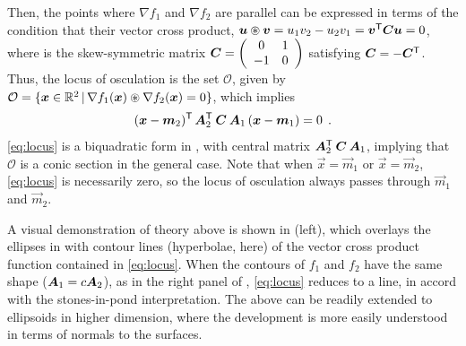 Then, the points where $\nabla f_1$ and $\nabla f_2$ are parallel can be expressed in terms of the
condition that their vector cross product, 
$\bm{u} \circledast \bm{v} = u_1 v_2 - u_2 v_1 = \bm{v}^\mathsf{T} \bm{C} \bm{u} = 0$, where  is the skew-symmetric matrix 
$ \bm{C} = \left(
\begin{array}{cc}
 0 & 1 \\ -1 & 0
\end{array}
\right)
$ satisfying $\bm{C} = -\bm{C}^\mathsf{T}$.
Thus, the locus of osculation is the set $\mathcal{O}$, given by $\mathcal{O}  = \{\bm{x} \in \mathbb{R}^{2} \, | \, \nabla f_1(\bm{x}) \circledast \nabla f_2(\bm{x}) = 0 \}$,
which implies
\begin{equation}
(\bm{x}-\bm{m}_2)^\mathsf{T} \, \bm{A}_2 ^\mathsf{T} \: \bm{C} \: \bm{A}_1 \, (\bm{x}-\bm{m}_1) = 0  \:\: .  \label{eq:locus}   
\end{equation}
\eqref{eq:locus} is a biquadratic form in , with central matrix $\bm{A}_2 ^\mathsf{T} \: \bm{C} \: \bm{A}_1$,
implying that $\mathcal{O}$ is a conic section in the general case. Note that when $\vec{x}=\vec{m}_1$ or $\vec{x}=\vec{m}_2$,
\eqref{eq:locus} is necessarily zero, so the locus of osculation always passes through  $\vec{m}_1$ and $\vec{m}_2$.

A visual demonstration of theory above is
shown in  (left), which overlays the ellipses in  with contour lines 
(hyperbolae, here)
of 
the vector cross product function contained in \eqref{eq:locus}.
When the contours of $f_1$ and $f_2$ have the same shape ($\bm{A}_1 = c \bm{A}_2 $), as in the right panel of ,
\eqref{eq:locus}
reduces to a line, in accord with the stones-in-pond interpretation. 
The above can be readily extended to ellipsoids in higher dimension, where the development is more easily understood
in terms of normals to the surfaces.

